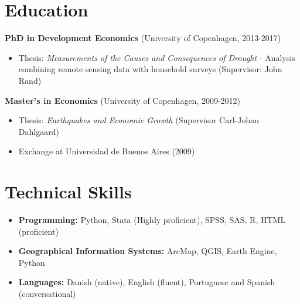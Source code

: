 \documentclass[a4paper,11pt]{article}
\begin{document}
\section{Education}
\vspace{0.2cm}
\textbf{PhD in Development Economics} (University of Copenhagen, 2013-2017)
\begin{itemize}[leftmargin=*, itemsep=0pt]
\item Thesis: \emph{Measurements of the Causes and Consequences of Drought} - Analysis combining remote sensing data with household surveys (Supervisor: John Rand)
\end{itemize}
\textbf{Master's in Economics} (University of Copenhagen, 2009-2012)
\begin{itemize}[leftmargin=*, itemsep=0pt]
\item Thesis: \emph{Earthquakes and Economic Growth} (Supervisor Carl-Johan Dahlgaard)
\item Exchange at Universidad de Buenos Aires (2009)
\end{itemize}

\section{Technical Skills}
\begin{itemize}[leftmargin=*, itemsep=2pt]
\item \textbf{Programming:} Python, Stata (Highly proficient), SPSS, SAS, R, HTML (proficient)
\item \textbf{Geographical Information Systems:} ArcMap, QGIS, Earth Engine, Python
\item \textbf{Languages:} Danish (native), English (fluent), Portuguese and Spanish (conversational)
\end{itemize}
\end{document}
